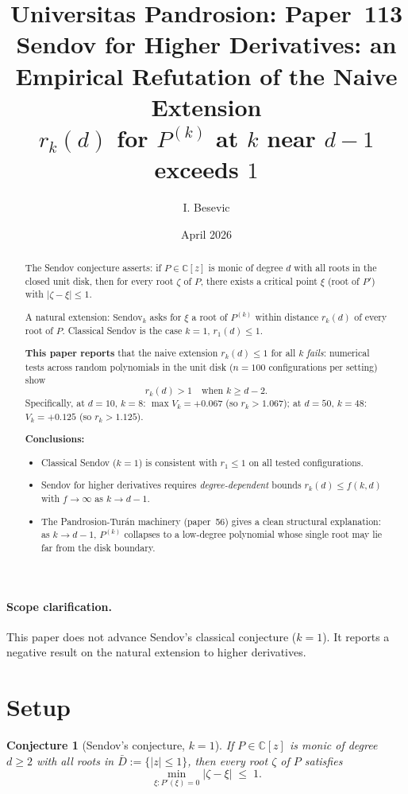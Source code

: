 \documentclass[11pt,a4paper]{article}
\title{Universitas Pandrosion: Paper~113 \\
Sendov for Higher Derivatives: an Empirical Refutation of the Naive Extension \\
\large $r_k(d)$ for $P^{(k)}$ at $k$ near $d-1$ exceeds $1$}
\author{I. Besevic}
\date{April 2026}
\newtheorem{conjecture}[theorem]{Conjecture}
\begin{document}
\maketitle

\begin{abstract}
The Sendov conjecture asserts: if $P \in \mathbb{C}[z]$ is monic of degree $d$
with all roots in the closed unit disk, then for every root $\zeta$ of $P$,
there exists a critical point $\xi$ (root of $P'$) with $|\zeta - \xi| \le 1$.

A natural extension: $\mathrm{Sendov}_k$ asks for $\xi$ a root of $P^{(k)}$
within distance $r_k(d)$ of every root of $P$. Classical Sendov is the case
$k = 1$, $r_1(d) \le 1$.

\textbf{This paper reports} that the naive extension $r_k(d) \le 1$ for all $k$
\emph{fails}: numerical tests across random polynomials in the unit disk
($n = 100$ configurations per setting) show
\[
r_k(d) > 1 \quad \text{when } k \ge d - 2.
\]
Specifically, at $d = 10$, $k = 8$: $\max V_k = +0.067$ (so $r_k > 1.067$);
at $d = 50$, $k = 48$: $V_k = +0.125$ (so $r_k > 1.125$).

\textbf{Conclusions:}
\begin{itemize}
\item Classical Sendov ($k = 1$) is consistent with $r_1 \le 1$ on all tested
configurations.
\item Sendov for higher derivatives requires \emph{degree-dependent} bounds
$r_k(d) \le f(k, d)$ with $f \to \infty$ as $k \to d - 1$.
\item The Pandrosion-Turán machinery (paper~56) gives a clean structural
explanation: as $k \to d - 1$, $P^{(k)}$ collapses to a low-degree polynomial
whose single root may lie far from the disk boundary.
\end{itemize}
\end{abstract}

\paragraph{Scope clarification.}
This paper does not advance Sendov's classical conjecture ($k = 1$). It
reports a negative result on the natural extension to higher derivatives.

\section{Setup}\label{sec:setup}

\begin{conjecture}[Sendov's conjecture, $k = 1$]\label{conj:sendov}
If $P \in \mathbb{C}[z]$ is monic of degree $d \ge 2$ with all roots in
$\bar{D} := \{|z| \le 1\}$, then every root $\zeta$ of $P$ satisfies
\[
\min_{\xi: P'(\xi) = 0} |\zeta - \xi| \;\le\; 1.
\]
\end{conjecture}
\end{document}
